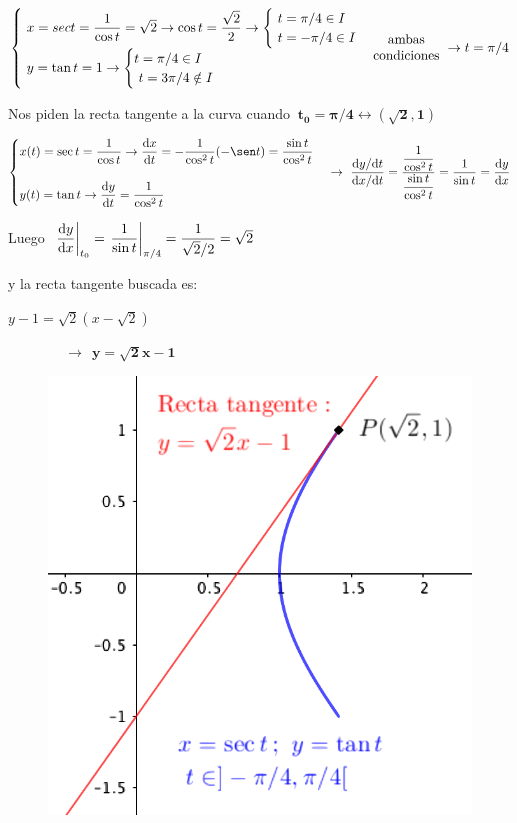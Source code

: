 \begin{small}
$\begin{cases} \ x=sec t=\dfrac 1{\cos t}=\sqrt 2 \to \cos t =\dfrac{\sqrt 2}{2} \to \begin{cases} \ t=\pi/4 \in I \\ \ t=-\pi/4 \in I \end{cases} \\
\ y=\tan t = 1 \to \begin{cases}  t=\pi/4 \in I \\ \ t=3\pi/4 \notin I \end{cases} 
\end{cases} \hspace{-5mm} \mqty{\text{ ambas } \\ \text{ condiciones }} \to   t=\pi/4 $

Nos piden la recta tangente a la curva cuando $\ \boldsymbol{ t_0=\pi/4 \leftrightarrow (\sqrt 2,1) } $

$\begin{cases}
x(t)=\sec t=\dfrac 1{\cos t} \to \displaystyle \displaystyle \dv{x}{t}=-\dfrac 1{\cos^2 t} (-\sen t)=\dfrac{\sin t}{\cos ^2 t}
\\ \\
y(t)=\tan t \to \displaystyle \dv{y}{t}=\dfrac {1}{\cos^2 t}
\end{cases}
\displaystyle  \to  \ 
\dfrac{\dd y / \dd t}{\dd x / \dd t}=\dfrac{\dfrac {1}{\cos^2 t}}{\dfrac{\sin t}{\cos ^2 t}}=\dfrac 1{\sin t}=\displaystyle \dv{y}{x} $
\end{small}
\begin{multicols}{2}

Luego $\ \eval{\displaystyle \dv{y}{x}}_{t_0}= \eval{\dfrac{1}{\sin t}}_{\pi/4}=\dfrac{1}{\sqrt{2}/2}=\sqrt 2 \ $ 

y la recta tangente buscada es:


$y-1=\sqrt 2(x-\sqrt 2) $

$\qquad  \qquad \to \ \ \boldsymbol{ y=\sqrt{2} x-1 }$
\begin{figure}[H]
	\centering
	\includegraphics[width=.25\textwidth]{img-polares/polares16b.png}
	\end{figure}
\end{multicols}


